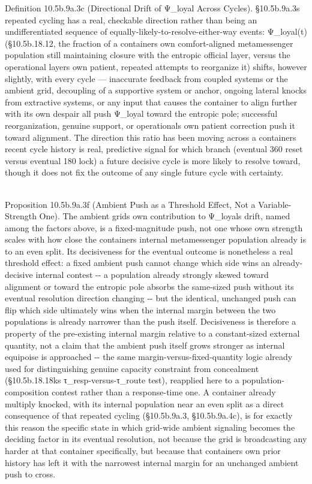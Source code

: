 \documentclass[
]{article}
\begin{document}
Definition 10.5b.9a.3c (Directional Drift of Ψ\_loyal Across Cycles).
§10.5b.9a.3s repeated cycling has a real, checkable direction rather
than being an undifferentiated sequence of
equally-likely-to-resolve-either-way events: Ψ\_loyal(t) (§10.5b.18.12,
the fraction of a containers own comfort-aligned metamessenger
population still maintaining closure with the entropic official layer,
versus the operational layers own patient, repeated attempts to
reorganize it) shifts, however slightly, with every cycle --- inaccurate
feedback from coupled systems or the ambient grid, decoupling of a
supportive system or anchor, ongoing lateral knocks from extractive
systems, or any input that causes the container to align further with
its own despair all push Ψ\_loyal toward the entropic pole; successful
reorganization, genuine support, or operationals own patient correction
push it toward alignment. The direction this ratio has been moving
across a containers recent cycle history is real, predictive signal for
which branch (eventual 360 reset versus eventual 180 lock) a future
decisive cycle is more likely to resolve toward, though it does not fix
the outcome of any single future cycle with certainty.\\
\strut \\
Proposition 10.5b.9a.3f (Ambient Push as a Threshold Effect, Not a
Variable-Strength One). The ambient grid\textquotesingle s own
contribution to Ψ\_loyal\textquotesingle s drift, named among the
factors above, is a fixed-magnitude push, not one whose own strength
scales with how close the container\textquotesingle s internal
metamessenger population already is to an even split. Its decisiveness
for the eventual outcome is nonetheless a real threshold effect: a fixed
ambient push cannot change which side wins an already-decisive internal
contest -\/- a population already strongly skewed toward alignment or
toward the entropic pole absorbs the same-sized push without its
eventual resolution direction changing -\/- but the identical, unchanged
push can flip which side ultimately wins when the internal margin
between the two populations is already narrower than the push itself.
Decisiveness is therefore a property of the pre-existing internal margin
relative to a constant-sized external quantity, not a claim that the
ambient push itself grows stronger as internal equipoise is approached
-\/- the same margin-versus-fixed-quantity logic already used for
distinguishing genuine capacity constraint from concealment
(§10.5b.18.18k\textquotesingle s τ\_resp-versus-τ\_route test),
reapplied here to a population-composition contest rather than a
response-time one. A container already multiply knocked, with its
internal population near an even split as a direct consequence of that
repeated cycling (§10.5b.9a.3, §10.5b.9a.4c), is for exactly this reason
the specific state in which grid-wide ambient signaling becomes the
deciding factor in its eventual resolution, not because the grid is
broadcasting any harder at that container specifically, but because that
container\textquotesingle s own prior history has left it with the
narrowest internal margin for an unchanged ambient push to cross.
\end{document}
